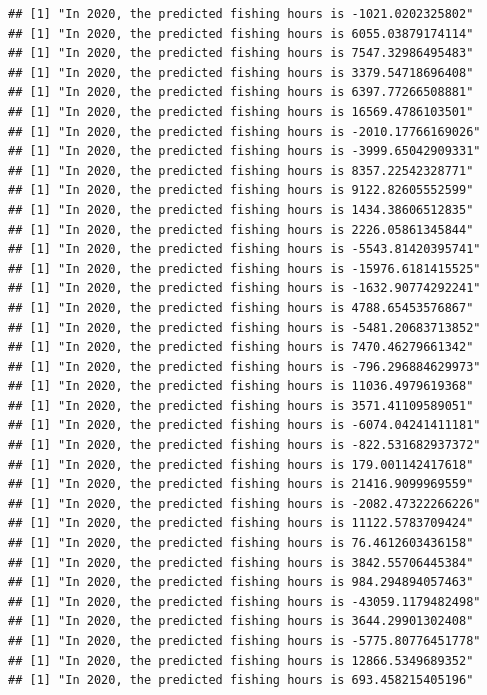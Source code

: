 \documentclass[
]{article}
\begin{document}
\begin{verbatim}
## [1] "In 2020, the predicted fishing hours is -1021.0202325802"
## [1] "In 2020, the predicted fishing hours is 6055.03879174114"
## [1] "In 2020, the predicted fishing hours is 7547.32986495483"
## [1] "In 2020, the predicted fishing hours is 3379.54718696408"
## [1] "In 2020, the predicted fishing hours is 6397.77266508881"
## [1] "In 2020, the predicted fishing hours is 16569.4786103501"
## [1] "In 2020, the predicted fishing hours is -2010.17766169026"
## [1] "In 2020, the predicted fishing hours is -3999.65042909331"
## [1] "In 2020, the predicted fishing hours is 8357.22542328771"
## [1] "In 2020, the predicted fishing hours is 9122.82605552599"
## [1] "In 2020, the predicted fishing hours is 1434.38606512835"
## [1] "In 2020, the predicted fishing hours is 2226.05861345844"
## [1] "In 2020, the predicted fishing hours is -5543.81420395741"
## [1] "In 2020, the predicted fishing hours is -15976.6181415525"
## [1] "In 2020, the predicted fishing hours is -1632.90774292241"
## [1] "In 2020, the predicted fishing hours is 4788.65453576867"
## [1] "In 2020, the predicted fishing hours is -5481.20683713852"
## [1] "In 2020, the predicted fishing hours is 7470.46279661342"
## [1] "In 2020, the predicted fishing hours is -796.296884629973"
## [1] "In 2020, the predicted fishing hours is 11036.4979619368"
## [1] "In 2020, the predicted fishing hours is 3571.41109589051"
## [1] "In 2020, the predicted fishing hours is -6074.04241411181"
## [1] "In 2020, the predicted fishing hours is -822.531682937372"
## [1] "In 2020, the predicted fishing hours is 179.001142417618"
## [1] "In 2020, the predicted fishing hours is 21416.9099969559"
## [1] "In 2020, the predicted fishing hours is -2082.47322266226"
## [1] "In 2020, the predicted fishing hours is 11122.5783709424"
## [1] "In 2020, the predicted fishing hours is 76.4612603436158"
## [1] "In 2020, the predicted fishing hours is 3842.55706445384"
## [1] "In 2020, the predicted fishing hours is 984.294894057463"
## [1] "In 2020, the predicted fishing hours is -43059.1179482498"
## [1] "In 2020, the predicted fishing hours is 3644.29901302408"
## [1] "In 2020, the predicted fishing hours is -5775.80776451778"
## [1] "In 2020, the predicted fishing hours is 12866.5349689352"
## [1] "In 2020, the predicted fishing hours is 693.458215405196"
\end{verbatim}
\end{document}
